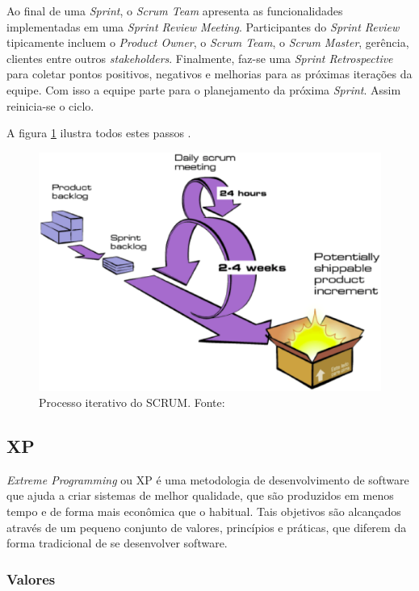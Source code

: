 Ao final de uma \textit{Sprint}, o \textit{Scrum Team} apresenta as funcionalidades implementadas em uma \textit{Sprint
Review Meeting}.  Participantes do \textit{Sprint Review} tipicamente incluem o \textit{Product Owner}, o \textit{Scrum
Team}, o \textit{Scrum Master}, gerência, clientes entre outros \textit{stakeholders}. Finalmente, faz-se uma \textit{Sprint Retrospective} para coletar pontos positivos, negativos e melhorias para as próximas iterações da equipe. Com isso a equipe parte para o planejamento da próxima \textit{Sprint}. Assim reinicia-se o ciclo. \cite{scrum}

A figura \ref{fig:scrum} ilustra todos estes passos \cite{scrum}.

\begin{figure}[h!]
	\centering
  \includegraphics[keepaspectratio=true,scale=0.5]{figuras/scrum.eps}
  \caption[Processo iterativo do SCRUM.]{Processo iterativo do SCRUM. Fonte: \cite{scrum}}
	\label{fig:scrum}
\end{figure}

\subsection{XP}

\textit{Extreme Programming} ou XP é uma metodologia de desenvolvimento de software que ajuda a criar sistemas de melhor qualidade, que são produzidos em menos tempo e de forma mais econômica que o habitual. Tais objetivos são alcançados através de um pequeno conjunto de valores, princípios e práticas, que diferem da forma tradicional de se desenvolver software. \cite{xp}

\subsubsection{Valores}

